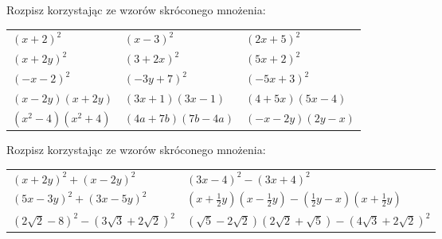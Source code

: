 \documentclass[12pt,a4paper]{article}
\theoremstyle{break}
\begin{document}
	\begin{zad}
		Rozpisz korzystając ze wzorów skróconego mnożenia:
	\end{zad}
	\begin{enumerate}[a)] \begin{tabular}{p{5cm} p{5cm} p{5cm}} 
			\item $(x+2)^2$ & \vspace{0.25cm}\item$(x-3)^2$ &\vspace{0.25cm}\item $(2x+5)^2$\\
			\item $(x+2y)^2$ & \item $(3+2x)^2$ &\item $(5x+2)^2$\\
			\item $(-x-2)^2$ & \item $(-3y+7)^2$ &\item $(-5x+3)^2$\\
			\item $(x-2y)(x+2y)$ & \item $(3x+1)(3x-1)$ &\item $(4+5x)(5x-4)$\\
			\item $(x^2-4)(x^2+4)$ & \item $(4a+7b)(7b-4a)$ &\item $(-x-2y)(2y-x)$\\
	\end{tabular} \end{enumerate}
\newpage
	\begin{zad}
		Rozpisz korzystając ze wzorów skróconego mnożenia:
	\end{zad}

	\begin{enumerate}[a)] \begin{tabular}{p{8cm} p{8cm}} 
			\item $(x+2y)^2+(x-2y)^2$ & \vspace{0.25cm}\item$(3x-4)^2-(3x+4)^2$ \\
			\item $(5x-3y)^2+(3x-5y)^2$ & \item $(x+\frac{1}{2}y)(x-\frac{1}{2}y)-(\frac{1}{2}y-x)(x+\frac{1}{2}y)$ \\
			\item $(2\sqrt{2}-8)^2-(3\sqrt{3}+2\sqrt{2})^2$ & \item $(\sqrt{5}-2\sqrt{2})(2\sqrt{2}+\sqrt{5})-(4\sqrt{3}+2\sqrt{2})^2$ \\
	\end{tabular} \end{enumerate}
\end{document}
